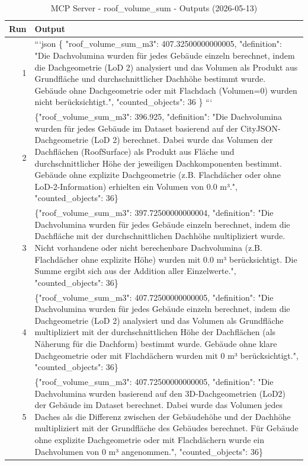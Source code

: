\documentclass[a4paper,11pt]{article}
\begin{document}
\begin{table}[ht]
\centering
\scriptsize
\caption{MCP Server - roof\_volume\_sum - Outputs (2026-05-13)}
\label{tab:mcp\_roof\_volume\_sum\_outputs\_2026-05-13}
\begin{tabular}{r p{12cm}}
\hline
Run & Output \\
\hline
1 & ```json
\{
  "roof\_volume\_sum\_m3": 407.32500000000005,
  "definition": "Die Dachvolumina wurden für jedes Gebäude einzeln berechnet, indem die Dachgeometrie (LoD 2) analysiert und das Volumen als Produkt aus Grundfläche und durchschnittlicher Dachhöhe bestimmt wurde. Gebäude ohne Dachgeometrie oder mit Flachdach (Volumen=0) wurden nicht berücksichtigt.",
  "counted\_objects": 36
\}
``` \\
2 & \{"roof\_volume\_sum\_m3": 396.925, "definition": "Die Dachvolumina wurden für jedes Gebäude im Dataset basierend auf der CityJSON-Dachgeometrie (LoD 2) berechnet. Dabei wurde das Volumen der Dachflächen (RoofSurface) als Produkt aus Fläche und durchschnittlicher Höhe der jeweiligen Dachkomponenten bestimmt. Gebäude ohne explizite Dachgeometrie (z.B. Flachdächer oder ohne LoD-2-Information) erhielten ein Volumen von 0.0 m³.", "counted\_objects": 36\} \\
3 & \{"roof\_volume\_sum\_m3": 397.72500000000004, "definition": "Die Dachvolumina wurden für jedes Gebäude einzeln berechnet, indem die Dachfläche mit der durchschnittlichen Dachhöhe multipliziert wurde. Nicht vorhandene oder nicht berechenbare Dachvolumina (z.B. Flachdächer ohne explizite Höhe) wurden mit 0.0 m³ berücksichtigt. Die Summe ergibt sich aus der Addition aller Einzelwerte.", "counted\_objects": 36\} \\
4 & \{"roof\_volume\_sum\_m3": 407.72500000000005, "definition": "Die Dachvolumina wurden für jedes Gebäude einzeln berechnet, indem die Dachgeometrie (LoD 2) analysiert und das Volumen als Grundfläche multipliziert mit der durchschnittlichen Höhe der Dachflächen (als Näherung für die Dachform) bestimmt wurde. Gebäude ohne klare Dachgeometrie oder mit Flachdächern wurden mit 0 m³ berücksichtigt.", "counted\_objects": 36\} \\
5 & \{"roof\_volume\_sum\_m3": 407.72500000000005, "definition": "Die Dachvolumina wurden basierend auf den 3D-Dachgeometrien (LoD2) der Gebäude im Dataset berechnet. Dabei wurde das Volumen jedes Daches als die Differenz zwischen der Gebäudehöhe und der Dachhöhe multipliziert mit der Grundfläche des Gebäudes berechnet. Für Gebäude ohne explizite Dachgeometrie oder mit Flachdächern wurde ein Dachvolumen von 0 m³ angenommen.", "counted\_objects": 36\} \\

\end{tabular}
\end{table}
\end{document}
